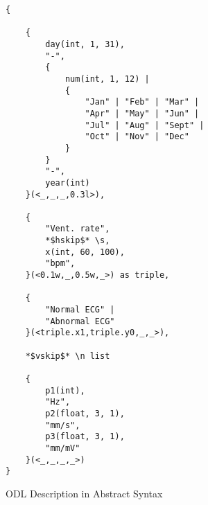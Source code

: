 %
%
%
\begin{figure}[th]
\begin{multicols}{2}
\scriptsize
\begin{verbatim}
{

    {
        day(int, 1, 31),
        "-",
        {
            num(int, 1, 12) |
            {
                "Jan" | "Feb" | "Mar" | 
                "Apr" | "May" | "Jun" | 
                "Jul" | "Aug" | "Sept" | 
                "Oct" | "Nov" | "Dec"
            }
        }
        "-",
        year(int)
    }(<_,_,_,0.3l>),

    {
        "Vent. rate",
        *$hskip$* \s,
        x(int, 60, 100),
        "bpm",
    }(<0.1w,_,0.5w,_>) as triple,

    {
        "Normal ECG" | 
        "Abnormal ECG"
    }(<triple.x1,triple.y0,_,_>),

    *$vskip$* \n list
    
    {
        p1(int),
        "Hz",
        p2(float, 3, 1),
        "mm/s",
        p3(float, 3, 1),
        "mm/mV"
    }(<_,_,_,_>)
}
\end{verbatim}
\end{multicols}
\caption{ODL Description in Abstract Syntax}
\label{fig:absdes}
\end{figure}


